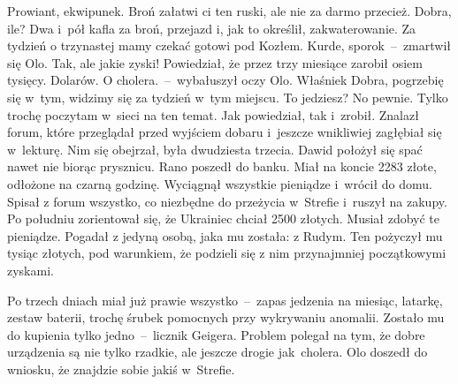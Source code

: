 \documentclass[../MAIN.tex]{subfiles}
\begin{document}
Prowiant, ekwipunek. Broń załatwi ci ten ruski, ale nie za darmo przecież.
\xx Dobra, ile?
\xx Dwa i~pół kafla za broń, przejazd i, jak to określił, zakwaterowanie. Za
tydzień o trzynastej mamy czekać gotowi pod Kozłem.
\xx Kurde, sporo\3k~--~zmartwił się Olo.
\xx Tak, ale jakie zyski! Powiedział, że przez trzy miesiące zarobił osiem
tysięcy. Dolarów.
\xx O cholera.~--~wybałuszył oczy Olo.
\xx Właśnie\3k
\xx Dobra, pogrzebię się w~tym, widzimy się za tydzień w~tym miejscu.
\xx To jedziesz?
\xx No pewnie. Tylko trochę poczytam w~sieci na ten temat.
\qd
Jak powiedział, tak i~zrobił. Znalazł forum, które przeglądał przed wyjściem dobaru i~jeszcze wnikliwiej zagłębiał się w~lekturę. Nim się obejrzał, była
dwudziesta trzecia. Dawid położył się spać nawet nie biorąc prysznicu.
Rano poszedł do banku. Miał na koncie 2283 złote, odłożone na czarną godzinę.
Wyciągnął wszystkie pieniądze i~wrócił do domu. Spisał z forum wszystko, co
niezbędne do przeżycia w~Strefie i~ruszył na zakupy.\\
Po południu zorientował się, że Ukrainiec chciał 2500 złotych. Musiał zdobyć te
pieniądze. Pogadał z jedyną osobą, jaka mu została: z Rudym. Ten pożyczył mu tysiąc złotych, pod warunkiem, że podzieli się z nim przynajmniej początkowymi zyskami.

Po trzech dniach miał już prawie wszystko~--~zapas jedzenia na miesiąc,
latarkę, zestaw baterii, trochę śrubek pomocnych przy wykrywaniu anomalii.
Zostało mu do kupienia tylko jedno~--~licznik Geigera. Problem polegał na tym,
że dobre urządzenia są nie tylko rzadkie, ale jeszcze drogie jak~cholera. Olo
doszedł do wniosku, że znajdzie sobie jakiś w~Strefie.
\end{document}
